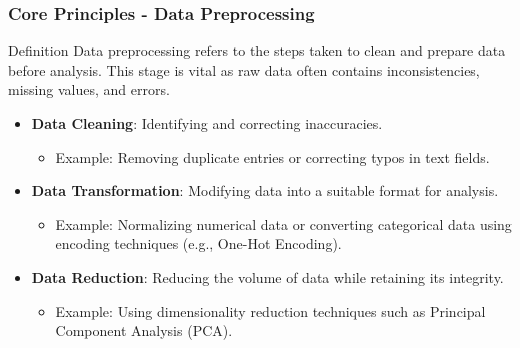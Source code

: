 \documentclass{beamer}
\begin{document}
\begin{frame}[fragile]
    \frametitle{Core Principles - Data Preprocessing}
    \begin{block}{Definition}
        Data preprocessing refers to the steps taken to clean and prepare data before analysis. 
        This stage is vital as raw data often contains inconsistencies, missing values, and errors.
    \end{block}
    \begin{itemize}
        \item \textbf{Data Cleaning}: Identifying and correcting inaccuracies. 
        \begin{itemize}
            \item Example: Removing duplicate entries or correcting typos in text fields.
        \end{itemize}
        \item \textbf{Data Transformation}: Modifying data into a suitable format for analysis.
        \begin{itemize}
            \item Example: Normalizing numerical data or converting categorical data using encoding techniques (e.g., One-Hot Encoding).
        \end{itemize}
        \item \textbf{Data Reduction}: Reducing the volume of data while retaining its integrity.
        \begin{itemize}
            \item Example: Using dimensionality reduction techniques such as Principal Component Analysis (PCA).
        \end{itemize}
    \end{itemize}
\end{frame}
\end{document}
